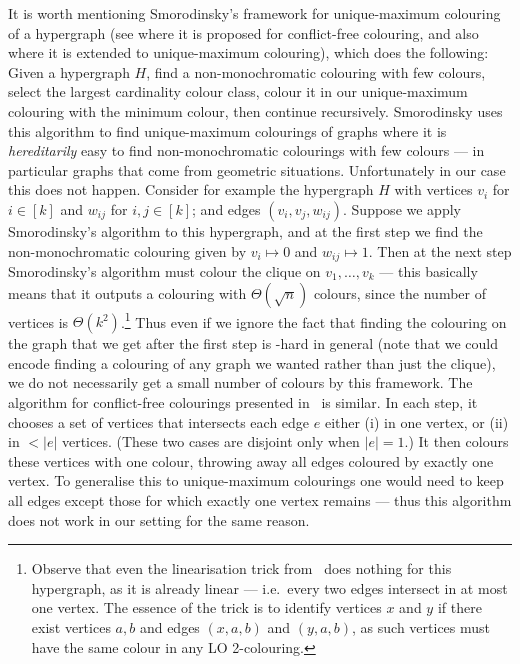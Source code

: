 \documentclass[a4paper,11pt]{article}
\theoremstyle{plain}
\theoremstyle{definition}
\begin{document}
It is worth mentioning Smorodinsky's framework for unique-maximum colouring of a hypergraph (see \cite{Smorodinsky07} where it is proposed for conflict-free colouring, and also~\cite{Smorodinsky2013} where it is extended to unique-maximum colouring), which does the following: Given a hypergraph $H$, find a non-monochromatic colouring with few colours, select the largest cardinality colour class, colour it in our unique-maximum colouring with the minimum colour, then continue recursively.  Smorodinsky uses this algorithm to find unique-maximum colourings of graphs where it is \emph{hereditarily} easy to find non-monochromatic colourings with few colours --- in particular graphs that come from geometric situations. Unfortunately in our case this does not happen. Consider for example the hypergraph $H$ with vertices $v_i$ for $i \in [k]$ and $w_{ij}$ for $i, j \in [k]$; and edges $(v_i, v_j, w_{ij})$. Suppose we apply Smorodinsky's algorithm to this hypergraph, and at the first step we find the non-monochromatic colouring given by $v_i \mapsto 0$ and $w_{ij} \mapsto 1$. Then at the next step Smorodinsky's algorithm must colour the clique on $v_1, \ldots, v_k$ --- this basically means that it outputs a colouring with $\Theta(\sqrt{n})$ colours, since the number of vertices is $\Theta(k^2)$.\footnote{Observe that even the linearisation trick from~\cite{NZ23:toct} does nothing for this hypergraph, as it is already linear --- i.e.~every two edges intersect in at most one vertex. The essence of the trick is to identify vertices $x$ and $y$ if there exist vertices $a, b$ and edges $(x, a, b)$ and $(y, a, b)$, as such vertices must have the same colour in any LO 2-colouring.} Thus even if we ignore the fact that finding the colouring on the graph that we get after the first step is \NP-hard in general (note that we could encode finding a colouring of any graph we wanted rather than just the clique), we do not necessarily get a small number of colours by this framework. The algorithm for conflict-free colourings presented in~\cite{Even02} is similar. In each step, it chooses a set of vertices that intersects each edge $e$ either (i) in one vertex, or (ii) in $< |e|$ vertices. (These two cases are disjoint only when $|e| = 1$.) It then colours these vertices with one colour, throwing away all edges coloured by exactly one vertex. To generalise this to unique-maximum colourings one would need to keep all edges except those for which exactly one vertex remains --- thus this algorithm does not work in our setting for the same reason.
\end{document}
